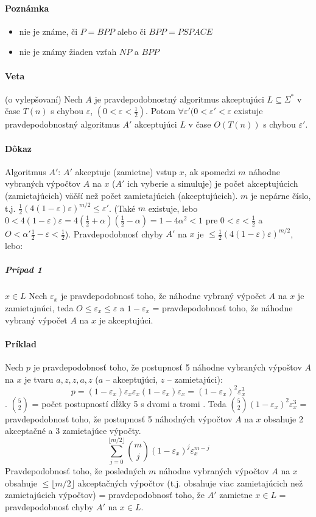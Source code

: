 \documentclass{article}
\begin{document}
\paragraph{Poznámka} 
\begin{itemize}
	\item nie je známe, či $P=BPP$ alebo či $BPP=PSPACE$
	\item nie je známy žiaden vzťah $NP$ a $BPP$
\end{itemize}

\paragraph{Veta} (o vylepšovaní) Nech $A$ je pravdepodobnostný algoritmus
akceptujúci $L \subseteq \Sigma^*$ v čase $T(n)$ s chybou $\varepsilon$, $(0 <
\varepsilon < \frac{1}{2})$. Potom $\forall \varepsilon' (0<\varepsilon'<
\varepsilon$ existuje pravdepodobnostný algoritmus $A'$ akceptujúci $L$ v čase
$O(T(n))$ s chybou $\varepsilon'$.

\paragraph{Dôkaz}
Algoritmus $A'$: $A'$ akceptuje (zamietne) vstup $x$, ak spomedzi $m$ náhodne
vybraných výpočtov $A$ na $x$ ($A'$ ich vyberie a simuluje) je počet
akceptujúcich (zamietajúcich) väčší než počet zamietajúcich (akceptujúcich). $m$
je nepárne číslo, t.j. $\frac{1}{2}(4(1-\varepsilon)\varepsilon)^{m/2} \leq
\varepsilon'$. (Také $m$ existuje, lebo $0 < 4(1-\varepsilon)\varepsilon =
4(\frac{1}{2} + \alpha)(\frac{1}{2} - \alpha) = 1 - 4\alpha^2 < 1$ pre $ 0<
\varepsilon < \frac{1}{2}$ a $O < \alpha '\frac{1}{2} - \varepsilon <
\frac{1}{2}$). Pravdepodobnosť chyby $A'$ na $x$ je  $\leq
\frac{1}{2}(4(1-\varepsilon)\varepsilon)^{m/2}$, lebo:
\subparagraph{Prípad 1} $x\in L$ Nech $\varepsilon_x$ je pravdepodobnosť toho,
že náhodne vybraný výpočet $A$ na $x$ je zamietajnúci, teda $O\leq \varepsilon_x
\leq \varepsilon$ a $1-\varepsilon_x$ = pravdepodobnosť toho, že náhodne vybraný
výpočet $A$ na $x$ je akceptujúci.

\paragraph{Príklad} Nech $p$ je pravdepodobnosť toho, že postupnosť 5 náhodne
vybraných výpoštov $A$ na $x$ je tvaru $a,z,z,a,z$ ($a$ -- akceptujúci, $z$ --
zamietajúci):
$$p=(1-\varepsilon_x)\varepsilon_x\varepsilon_x(1-\varepsilon_x)\varepsilon_x =
(1-\varepsilon_x)^2\varepsilon_x^3$$.
$\binom{5}{2}$ = počet postupností dĺžky 5 s dvomi  a tromi . Teda
$\binom{5}{2}(1-\varepsilon_x)^2\varepsilon_x^3 $ =  pravdepodobnosť toho, že
postupnosť 5 náhodných výpočtov $A$ na $x$ obsahuje 2 akceptačné a 3 zamietajúce
výpočty. 
$$ \sum_{j=0}^{\lfloor m/2 \rfloor} \binom{m}{j}
(1-\varepsilon_x)^j\varepsilon_x^{m-j}$$
Pravdepodobnosť toho, že posledných $m$ náhodne vybraných výpočtov $A$ na $x$
obsahuje $\leq \lfloor m/2 \rfloor$ akceptačných výpočtov (t.j. obsahuje viac
zamietajúcich než zamietajúcich výpočtov) = pravdepodobnosť toho, že $A'$
zamietne $x\in L$ = pravdepodobnosť chyby $A'$ na $x\in L$.
\end{document}
